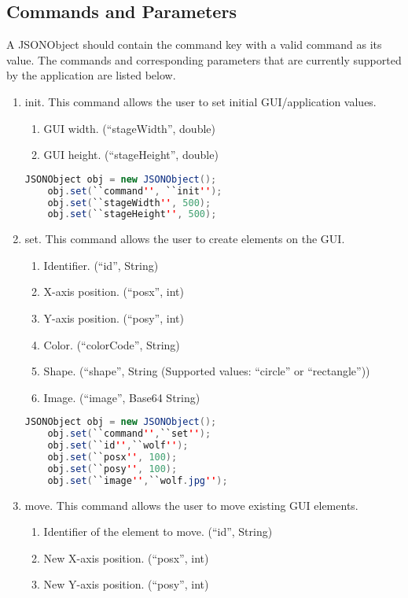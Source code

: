 \documentclass[11pt,a4paper]{article}
\begin{document}
\subsection{Commands and Parameters}

A JSONObject should contain the command key with a valid command as its value. The commands and corresponding parameters that are currently supported by the application are listed below. 
\begin{enumerate}
	\item init. This command allows the user to set initial GUI/application values.
		\begin{enumerate}
			\item GUI width. (``stageWidth'', double)
			\item GUI height. (``stageHeight'', double)
		\end{enumerate}
	\begin{lstlisting}[language=java]
	JSONObject obj = new JSONObject();
	obj.set(``command'', ``init'');
	obj.set(``stageWidth'', 500);
	obj.set(``stageHeight'', 500);
	\end{lstlisting}
	\item set. This command allows the user to create elements on the GUI.
		\begin{enumerate}
			\item Identifier. (``id'', String)
			\item X-axis position. (``posx'', int)
			\item Y-axis position. (``posy'', int)
			\item Color. (``colorCode'', String)
			\item Shape. (``shape'', String (Supported values: ``circle'' or ``rectangle''))
			\item Image. (``image'', Base64 String)
		\end{enumerate}
	\begin{lstlisting}[language=java]
	JSONObject obj = new JSONObject();
	obj.set(``command'',``set'');
	obj.set(``id'',``wolf'');
	obj.set(``posx'', 100);
	obj.set(``posy'', 100);
	obj.set(``image'',``wolf.jpg'');
	\end{lstlisting}
	\item move. This command allows the user to move existing GUI elements.
		\begin{enumerate}
			\item Identifier of the element to move. (``id'', String)
			\item New X-axis position. (``posx'', int)
			\item New Y-axis position. (``posy'', int)

\end{enumerate}
\end{enumerate}
\end{document}
